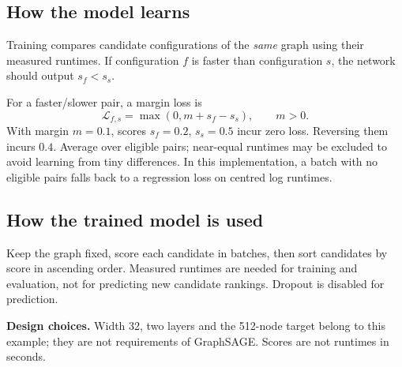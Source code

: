 \documentclass[11pt,a4paper]{article}
\begin{document}
\subsection*{How the model learns}
Training compares candidate configurations of the \emph{same} graph using their
measured runtimes. If configuration $f$ is faster than configuration $s$, the
network should output $s_f<s_s$.
\begin{center}
\end{center}
For a faster/slower pair, a margin loss is
\[
\mathcal{L}_{f,s}=\max(0,m+s_f-s_s),\qquad m>0.
\]
With margin $m=0.1$, scores $s_f=0.2$, $s_s=0.5$ incur zero loss. Reversing them
incurs $0.4$. Average over eligible pairs; near-equal runtimes may be excluded
to avoid learning from tiny differences. In this implementation, a batch with
no eligible pairs falls back to a regression loss on centred log runtimes.

\subsection*{How the trained model is used}
Keep the graph fixed, score each candidate in batches, then sort candidates by
score in ascending order. Measured runtimes are needed for training and evaluation,
not for predicting new candidate rankings. Dropout is disabled for prediction.

\textbf{Design choices.} Width 32, two layers and the 512-node target belong to this
example; they are not requirements of GraphSAGE. Scores are not runtimes in seconds.
\end{document}
